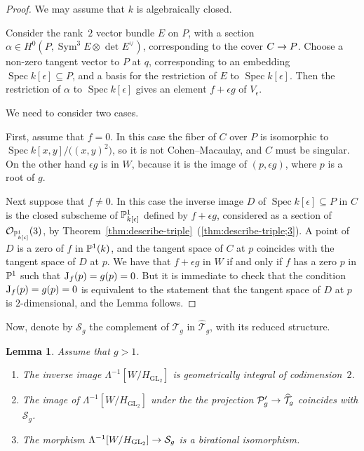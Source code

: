 \documentclass{amsart}
\numberwithin{equation}{section}
\numberwithin{subsection}{section}
\newenvironment{enumeratea}
{\begin{enumerate}[\upshape (a)]}
{\end{enumerate}}
\newtheorem{lemma}[theorem]{Lemma}
\theoremstyle{definition}
\theoremstyle{remark}
\newcommand\refall[2]{\ref{#1}~(\ref{#1;#2})}
\newcommand\cO{\mathcal{O}} \newcommand\cP{\mathcal{P}}
\newcommand\cS{\mathcal{S}} \newcommand\cT{\mathcal{T}}
\newcommand\arr{\ifinner\to\else\longrightarrow\fi}
\newcommand\spec{\operatorname{Spec}}
\newcommand{\T}[1][g]{\cT_{#1}}
\newcommand{\OT}[1][g]{\widehat{\cT}_{#1}}
\newcommand{\GL}{\mathrm{GL}}
\newcommand{\sym}{\operatorname{Sym}}
\newcommand{\symthree}[2][]{\sym^{3}_{{#1}}{#2} \otimes_{{#1}} \det\nolimits_{{#1}} {#2}\dual}
\newcommand{\dual}{^{\vee}}
\newcommand\Hg{H_{\GL_2}}
\newcommand\Ve{V_{\epsilon}}
\begin{document}
\begin{proof}
We may assume that $k$ is algebraically closed. 

Consider the rank~$2$ vector bundle $E$ on $P$, with a section $\alpha \in H^0(P,\symthree{E})$, corresponding to the cover $C \arr P$. Choose a non-zero tangent vector to $P$ at $q$, corresponding to an embedding $\spec k[\epsilon] \subseteq P$, and a basis for the restriction of $E$ to $\spec k[\epsilon]$. Then the restriction of $\alpha$ to $\spec k[\epsilon]$ gives an element $f + \epsilon g$ of $\Ve$.

We need to consider two cases.

First, assume that $f = 0$. In this case the fiber of $C$ over $P$ is isomorphic to $\spec k[x,y]/\bigl((x,y)^{2}\bigr)$, so it is not Cohen--Macaulay, and $C$ must be singular. On the other hand $\epsilon g$ is in $W$, because it is the image of $(p, \epsilon g)$, where $p$ is a root of $g$.

Next suppose that $f \neq 0$. In this case the inverse image $D$ of $\spec k[\epsilon] \subseteq P$ in $C$ is the closed subscheme of $\mathbb{P}^{1}_{k[\epsilon]}$ defined by $f + \epsilon g$, considered as a section of $\cO_{\PP^{1}_{k[\epsilon]}}(3)$, by Theorem~\refall{thm:describe-triple}{3}. A point of $D$ is a zero of $f$ in $\mathbb{P}^{1}(k)$, and the tangent space of $C$ at $p$ coincides with the tangent space of $D$ at $p$. We have that $f + \epsilon g$ in $W$ if and only if $f$ has a zero $p$ in $\mathbb{P}^{1}$ such that $\mathrm{J}_{f}(p) = g(p) = 0$. But it is immediate to check that the condition $\mathrm{J}_{f}(p) = g(p) = 0$ is equivalent to the statement that the tangent space of $D$ at $p$ is $2$-dimensional, and the Lemma follows.
\end{proof}

Now, denote by $\cS_{g}$ the complement of $\T$ in $\OT$, with its reduced structure.

\begin{lemma}\label{lem:properties-W}
Assume that $g > 1$.
\begin{enumeratea}

\item The inverse image $\Lambda^{-1}[W/ \Hg]$ is geometrically integral of codimension~$2$.

\item The image of $\Lambda^{-1}[W/ \Hg]$ under the the projection $\cP'_{g} \arr \OT$ coincides with $\cS_{g}$.

\item The morphism $\Lambda^{-1}[W/ \Hg] \arr \cS_{g}$ is a birational isomorphism.

\end{enumeratea}
\end{lemma}
\end{document}
